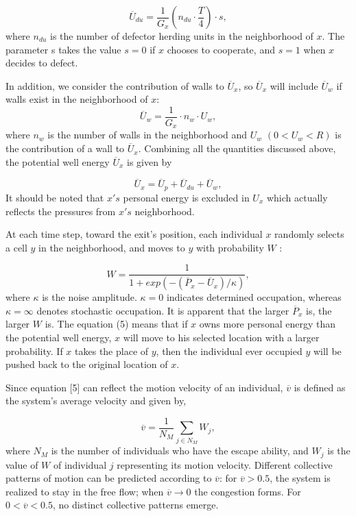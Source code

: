 \documentclass[%
 reprint,
 amsmath,amssymb,
 aps,
]{revtex4-1}
\begin{document}
\begin{equation}
\overline{U}_{du}=\frac{1}{G_{x}}(n_{du}\cdot \frac{T}{4})\cdot s,
\end{equation}
where $n_{du}$ is the number of defector herding units in the neighborhood of $x$. The parameter s takes the value $s = 0$ if $x$ chooses to cooperate, and $s = 1$ when $x$ decides to defect.

In addition, we consider the contribution of walls to $\overline{U}_{x}$, so $\overline{U}_{x}$ will include $\overline{U}_{w}$ if walls exist in the
neighborhood of $x$:
\begin{equation}
\overline{U}_{w}=\frac{1}{G_{x}}\cdot n_{w}\cdot U_{w},
\end{equation}
where $n_{w}$ is the number of walls in the neighborhood and $U_{w}$ $(0<U_{w}<R)$ is the contribution of a wall to $\overline{U}_{x}$.
Combining all the quantities discussed above, the potential well energy $\overline{U}_{x}$ is given by

\begin{equation}
\overline{U}_{x}=\overline{U}_{p}+\overline{U}_{du}+\overline{U}_{w},
\end{equation}
It should be noted that $x's$ personal energy is excluded in $U_{x}$ which actually reflects the pressures from $x's$ neighborhood.


At each time step, toward the exit's position, each individual $x$ randomly selects a cell $y$ in the neighborhood, and moves to $y$ with probability $W$ \cite{game7}:

\begin{equation}
W=\frac{1}{1+exp(-(\overline{P}_{x}-\overline{U}_{x})/\kappa)},
\end{equation}
where $\kappa$ is the noise amplitude. $\kappa=0$ indicates determined occupation, whereas $\kappa=\infty$ denotes stochastic occupation. It is apparent that the larger $\overline{P}_{x}$ is, the larger $W$ is. The equation (5) means that if $x$ owns more personal energy than the potential well energy, $x$ will move to his selected location with a larger probability. If $x$ takes the place of $y$, then the individual ever occupied $y$ will be pushed back to the original location of $x$.

Since equation [5] can reflect the motion velocity of an individual, $\overline{v}$ is defined as the system's average velocity and given by,

\begin{equation}
\overline{v}=\frac{1}{N_{M}}\sum_{j\in N_{M}}W_{j},
\end{equation}
where $N_{M}$ is the number of individuals who have the escape ability, and $W_{j}$ is the value of $W$ of individual $j$ representing its motion velocity. Different collective patterns of motion can be predicted according to $\overline{v}$: for $\overline{v}>0.5$, the system is realized to stay in the free flow; when $\overline{v}\rightarrow0$ the congestion forms. For $0<\overline{v}<0.5$, no distinct collective patterns emerge.
\end{document}
